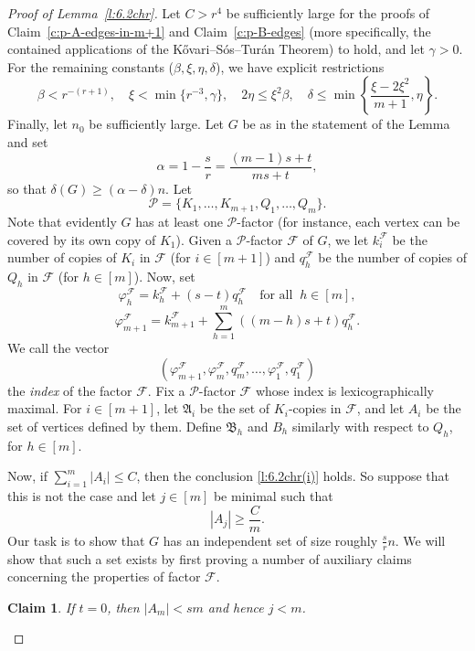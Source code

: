 \documentclass[reqno, 12pt]{amsart}
\numberwithin{equation}{section}
\numberwithin{figure}{section}
\theoremstyle{plain}
\newtheorem{claim}[thm]{Claim}
\theoremstyle{definition}
\let\phi=\varphi
\def\cF{{\mathcal F}}
\def\cP{{\mathcal P}}
\def\fA{\mathfrak{A}}
\def\fB{\mathfrak{B}}
\let\Pc=\cP
\begin{document}
    \begin{proof}[Proof of Lemma~\ref{l:6.2chr}]
         Let $C>r^4$ be sufficiently large for the proofs of Claim~\ref{c:p-A-edges-in-m+1} and Claim~\ref{c:p-B-edges} (more specifically, the contained applications of the K\H{o}vari--S\'os--Tur\'an Theorem) to hold, and let $\gamma >0$. For the remaining constants ($\beta, \xi, \eta, \delta$), we have explicit restrictions 
          \[ \beta<r^{-(r+1)}, \quad \xi < \min \{ r^{-3}, \gamma \},\quad 2\eta \leq \xi^2 \beta, \quad \delta \leq \min\left\{\frac{\xi-2\xi^2}{m+1}, \eta \right\}.\]
        Finally, let $n_0$ be sufficiently large.
        Let $G$ be as in the statement of the Lemma and set \[\alpha=1-\frac{s}{r}=\frac{(m-1)s+t}{ms+t},\] so that $\delta(G)\geq (\alpha-\delta)n$. Let \[\Pc=\{K_1,\dots,K_{m+1},Q_1,\dots, Q_m\}.\]
        Note that evidently $G$ has at least one $\Pc$-factor (for instance, each vertex can be covered by its own copy of $K_1$). Given a $\Pc$-factor $\cF$ of $G$, we let $k_i^\cF$ be the number of copies of $K_i$ in $\cF$ (for $i\in [m+1]$) and $q_h^\cF$ be the number of copies of $Q_h$ in $\cF$ (for $h\in [m]$). Now, set
        $$\phi_h^\cF=k_h^\cF+(s-t)q_h^\cF \quad \text
            {for all }\ h\in [m],$$
        $$\phi_{m+1}^\cF=k_{m+1}^\cF+\sum_{h=1}^m((m-h)s+t)q_h^\cF.$$
        We call the vector
    \[(\phi_{m+1}^\cF,\phi_m^\cF,q_m^\cF,\dots, \phi_1^\cF,q_1^\cF)\]
        the \emph{index} of the factor $\cF$. Fix a $\cP$-factor $\cF$ whose index is lexicographically maximal. 
        For $i \in [m+1]$, let $\fA_i$ be the set of $K_i$-copies in $\cF$, and let $A_i$ be the set of vertices defined by them. Define $\fB_h$ and $B_h$ similarly with respect to $Q_h$, for $h\in [m]$. 
        
        Now, if $\sum_{i=1}^m|A_i| \leq C$, then the conclusion \ref{l:6.2chr(i)} holds. So suppose that this is not the case and let $j\in [m]$ be minimal such that 
        \begin{equation}\label{eq:A_j}
            |A_j|\geq \frac{C}{m}.
        \end{equation}
        Our task is to show that $G$ has an independent set of size roughly $\frac{s}{r}n$. We will show that such a set exists by first proving a number of auxiliary claims concerning the properties of factor $\cF$. 
        

        \begin{claim}
            \label{c:singular-A_m}
            If $t=0$, then $|A_m|< sm$ and hence $j<m$.
        \end{claim}
        

\end{proof}
\end{document}

